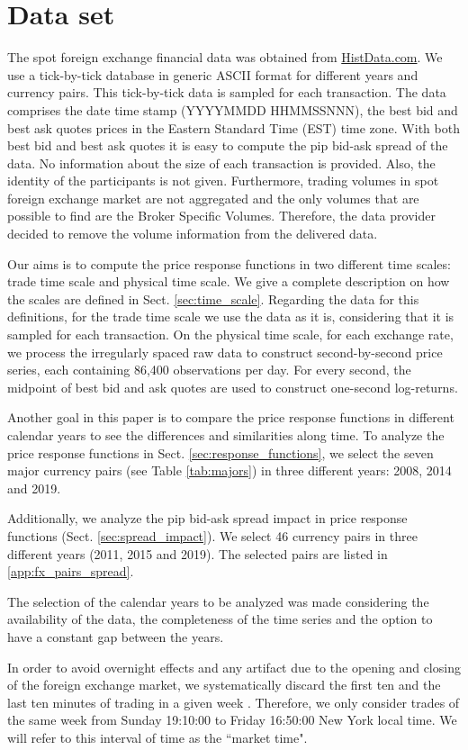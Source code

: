 \section{Data set}\label{sec:data_set}

The spot foreign exchange financial data was obtained from
\href{www.histdata.com}{HistData.com}. We use a tick-by-tick database in
generic ASCII format for different years and currency pairs. This tick-by-tick
data is sampled for each transaction. The data comprises the date time stamp
(YYYYMMDD HHMMSSNNN), the best bid and best ask quotes prices in the Eastern
Standard Time (EST) time zone. With both best bid and best ask quotes it is
easy to compute the pip bid-ask spread of the data. No information about the
size of each transaction is provided. Also, the identity of the participants is
not given. Furthermore, trading volumes in spot foreign exchange market are not
aggregated and the only volumes that are possible to find are the Broker
Specific Volumes. Therefore, the data provider decided to remove the volume
information from the delivered data.

Our aims is to compute the price response functions in two different
time scales: trade time scale and physical time scale. We give a complete
description on how the scales are defined in Sect.  \ref{sec:time_scale}.
Regarding the data for this definitions, for the trade time scale we use the
data as it is, considering that it is sampled for each transaction. On the
physical time scale, for each exchange rate, we process the irregularly spaced
raw data to construct second-by-second price series, each containing 86,400
observations per day. For every second, the midpoint of best bid and ask quotes
are used to construct one-second log-returns.

Another goal in this paper is to compare the price response functions in
different calendar years to see the differences and similarities along time.
To analyze the price response functions in Sect. \ref{sec:response_functions},
we select the seven major currency pairs (see Table \ref{tab:majors}) in three
different years: 2008, 2014 and 2019.

Additionally, we analyze the pip bid-ask spread impact in price response
functions (Sect. \ref{sec:spread_impact}). We select 46 currency pairs in three
different years (2011, 2015 and 2019). The selected pairs are listed in
\ref{app:fx_pairs_spread}.

The selection of the calendar years to be analyzed was made considering the
availability of the data, the completeness of the time series and the option to
have a constant gap between the years.

In order to avoid overnight effects and any artifact due to the opening and
closing of the foreign exchange market, we systematically discard the first
ten and the last ten minutes of trading in a given week
\cite{Bouchaud_2004,my_paper_response_financial,Wang_2016_cross,large_prices_changes,spread_changes_affect}.
Therefore, we only consider trades of the same week from Sunday 19:10:00 to
Friday 16:50:00 New York local time. We will refer to this interval of time as
the ``market time".
